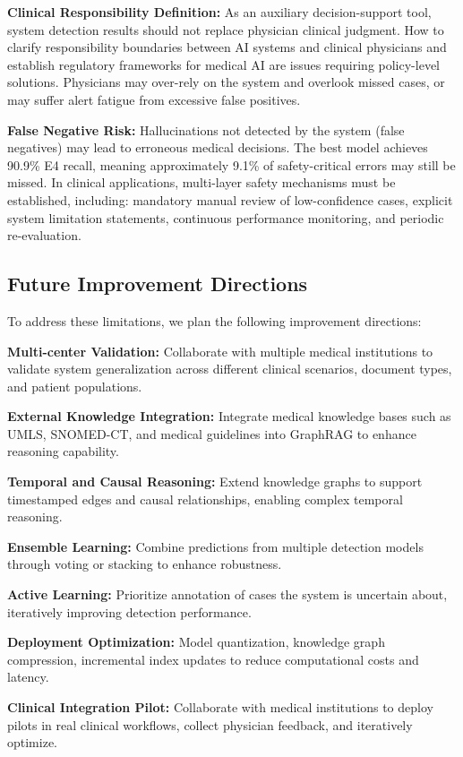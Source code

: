 \documentclass[11pt]{article}
\begin{document}
\textbf{Clinical Responsibility Definition:} As an auxiliary decision-support tool, system detection results should not replace physician clinical judgment. How to clarify responsibility boundaries between AI systems and clinical physicians and establish regulatory frameworks for medical AI are issues requiring policy-level solutions. Physicians may over-rely on the system and overlook missed cases, or may suffer alert fatigue from excessive false positives.

\textbf{False Negative Risk:} Hallucinations not detected by the system (false negatives) may lead to erroneous medical decisions. The best model achieves 90.9\% E4 recall, meaning approximately 9.1\% of safety-critical errors may still be missed. In clinical applications, multi-layer safety mechanisms must be established, including: mandatory manual review of low-confidence cases, explicit system limitation statements, continuous performance monitoring, and periodic re-evaluation.

\subsection{Future Improvement Directions}

To address these limitations, we plan the following improvement directions:

\textbf{Multi-center Validation:} Collaborate with multiple medical institutions to validate system generalization across different clinical scenarios, document types, and patient populations.

\textbf{External Knowledge Integration:} Integrate medical knowledge bases such as UMLS, SNOMED-CT, and medical guidelines into GraphRAG to enhance reasoning capability.

\textbf{Temporal and Causal Reasoning:} Extend knowledge graphs to support timestamped edges and causal relationships, enabling complex temporal reasoning.

\textbf{Ensemble Learning:} Combine predictions from multiple detection models through voting or stacking to enhance robustness.

\textbf{Active Learning:} Prioritize annotation of cases the system is uncertain about, iteratively improving detection performance.

\textbf{Deployment Optimization:} Model quantization, knowledge graph compression, incremental index updates to reduce computational costs and latency.

\textbf{Clinical Integration Pilot:} Collaborate with medical institutions to deploy pilots in real clinical workflows, collect physician feedback, and iteratively optimize.
\end{document}
